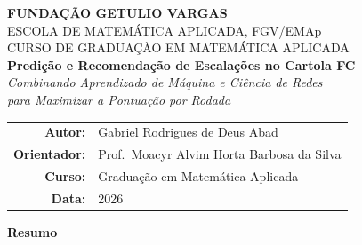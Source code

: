 \documentclass[12pt, a4paper, oneside]{article}
\begin{document}

\thispagestyle{empty}
\begin{center}
  {\large\bfseries\color{azulfgv} FUNDAÇÃO GETULIO VARGAS}\\[0.3em]
  {\normalsize\color{azulfgv} ESCOLA DE MATEMÁTICA APLICADA, FGV/EMAp}\\[0.3em]
  {\normalsize\color{azulfgv} CURSO DE GRADUAÇÃO EM MATEMÁTICA APLICADA}\\[2.5cm]
  {\Large\bfseries\color{azulfgv}
    Predição e Recomendação de Escalações no Cartola FC}\\[0.6em]
  {\large\itshape
    Combinando Aprendizado de Máquina e Ciência de Redes\\
    para Maximizar a Pontuação por Rodada}\\[2.5cm]
  {\normalsize
    \begin{tabular}{rl}
      \textbf{Autor:}      & Gabriel Rodrigues de Deus Abad \\[0.3em]
      \textbf{Orientador:} & Prof.\ Moacyr Alvim Horta Barbosa da Silva \\[0.3em]
      \textbf{Curso:}      & Graduação em Matemática Aplicada \\[0.3em]
      \textbf{Data:}       & 2026 \\
    \end{tabular}}
\end{center}
\vfill\newpage

\thispagestyle{empty}
\begin{center}{\large\bfseries Resumo}\end{center}
\vspace{0.5em}
\end{document}
